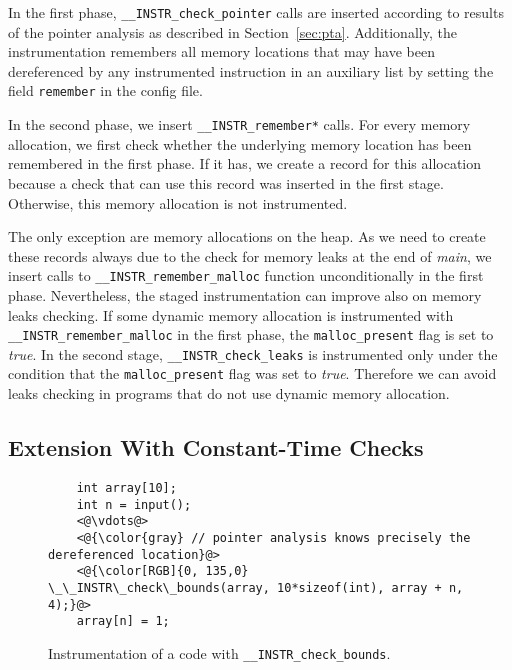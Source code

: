 In the first phase, \texttt{\_\_INSTR\_check\_pointer} calls are inserted
according to results of the pointer analysis as described in
Section~\ref{sec:pta}. Additionally, the instrumentation remembers all memory
locations that may have been dereferenced by any instrumented instruction in an
auxiliary list by setting the field \texttt{remember} in the config file.

In the second phase, we insert \texttt{\_\_INSTR\_remember*} calls. For every
memory allocation, we first check whether the underlying memory location has
been remembered in the first phase.  If it has, we
create a record for this allocation because a check that can use this record
was inserted in the first stage. Otherwise, this memory allocation is not
instrumented.

The only exception are memory allocations on the heap. As we need to
create these records always due to the check for memory leaks at the
end of \emph{main}, we insert calls to
\texttt{\_\_INSTR\_remember\_malloc} function unconditionally in the
first phase.  Nevertheless, the staged instrumentation can improve
also on memory leaks checking. If some dynamic memory allocation is
instrumented with \texttt{\_\_INSTR\_remember\_malloc} in the first
phase, the \texttt{malloc\_present} flag is set to \emph{true}.  In
the second stage, \texttt{\_\_INSTR\_check\_leaks} is instrumented
only under the condition that the \texttt{malloc\_present} flag was
set to \emph{true}. Therefore we can avoid leaks checking in programs
that do not use dynamic memory allocation.


\subsection{Extension With Constant-Time Checks}\label{sec:constant_time}

\begin{figure}[t]
	\begin{lstlisting}
    int array[10];
    int n = input();
    <@\vdots@>
    <@{\color{gray} // pointer analysis knows precisely the dereferenced location}@>
    <@{\color[RGB]{0, 135,0} \_\_INSTR\_check\_bounds(array, 10*sizeof(int), array + n, 4);}@>
    array[n] = 1;
	\end{lstlisting}
	\caption{Instrumentation of a code with \texttt{\_\_INSTR\_check\_bounds}.}
	\label{fig:check_bounds_example}
\end{figure}

